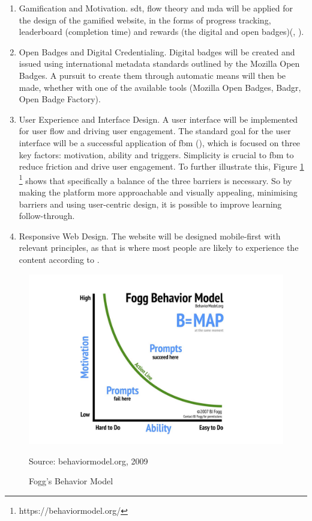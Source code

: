 \begin{enumerate}
  \addtolength{\itemsep}{-0.5\baselineskip} 
  \item {Gamification and Motivation.} \acrshort{sdt}, flow theory and \acrshort{mda} will be applied for the design of the gamified website, in the forms of progress tracking, leaderboard (completion time) and rewards (the digital and open badges)(\cite{sdt}, \cite{flow}).
  \item {Open Badges and Digital Credentialing.} Digital badges will be created and issued using international metadata standards outlined by the Mozilla Open Badges. 
  A pursuit to create them through automatic means will then be made, whether with one of the available tools (Mozilla Open Badges, Badgr, Open Badge Factory).
  \item {User Experience and Interface Design.} A user interface will be implemented for user flow and driving user engagement. 
  The standard goal for the user interface will be a successful application of \acrshort{fbm} (\cite{fogg}), which is focused on three key factors: motivation, ability and triggers. 
  Simplicity is crucial to \acrshort{fbm}  to reduce friction and drive user engagement. 
  To further illustrate this, Figure \ref{fig:foggChart} \footnote{https://behaviormodel.org/} shows that specifically a balance of the three barriers is necessary. 
  So by making the platform more approachable and visually appealing, minimising barriers and using user-centric design, it is possible to improve learning follow-through.
  \item {Responsive Web Design.} The website will be designed mobile-first with relevant principles, as that is where most people are likely to experience the content according to \textcite{mobileDesign}. 
\end{enumerate}

\begin{figure}[htbp]
 \centering
 \includegraphics[width=14cm]{Media/Fogg-Behavior-Model.jpg}
 \caption{Fogg's Behavior Model}
 \label{fig:foggChart}
 {\raggedright \small{Source:} behaviormodel.org, 2009\par}
\end{figure}

